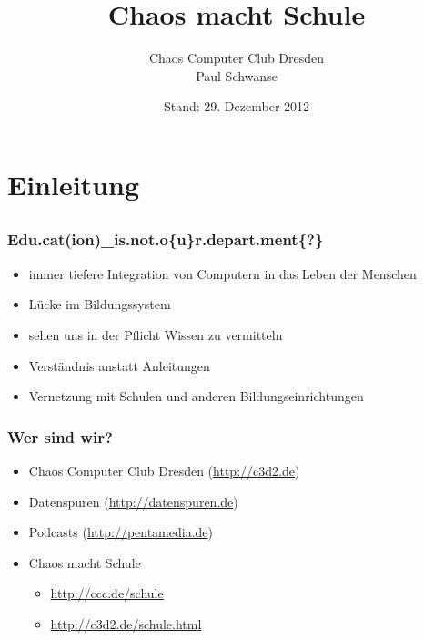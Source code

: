 \documentclass[14pt,handout]{beamer}
\title{Chaos macht Schule}
\author{Chaos Computer Club Dresden\\Paul Schwanse}
\date{Stand: 29. Dezember 2012}
\begin{document}
\maketitle

\frame{\tableofcontents[hideallsubsections]}

\section{Einleitung}
\subsection{}

\begin{frame}
    \frametitle{Edu.cat(ion)\_is.not.o\{u\}r.dep\/art.ment\{?\}}
    \begin{itemize}
        \item<2-> immer tiefere Integration von Computern in das Leben der Menschen
        \item<3-> Lücke im Bildungssystem
        \item<4-> sehen uns in der Pflicht Wissen zu vermitteln
        \item<5-> Verständnis anstatt Anleitungen
        \item<6-> Vernetzung mit Schulen und anderen Bildungseinrichtungen
    \end{itemize}
\end{frame}

\begin{frame}
    \frametitle{Wer sind wir?}
    \begin{itemize}
        \item<2-> Chaos Computer Club Dresden (\url{http://c3d2.de})
            \note{}
        \item<3-> Datenspuren (\url{http://datenspuren.de})
        \item<4-> Podcasts (\url{http://pentamedia.de})
        \item<5-> Chaos macht Schule
            \begin{itemize}
                \item \url{http://ccc.de/schule}
                \item \url{http://c3d2.de/schule.html}
            \end{itemize}
    \end{itemize}
\end{frame}
\end{document}

